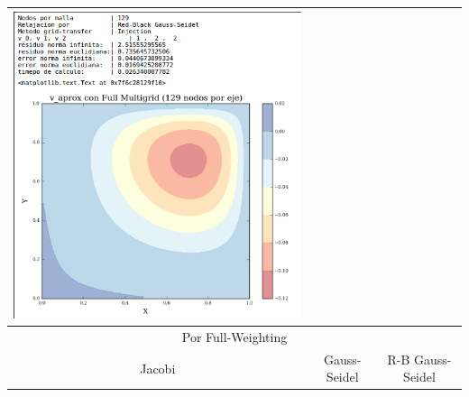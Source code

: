 \documentclass[letter,10pt]{article}
\begin{document}
\begin{table}[H]
\begin{tabular}[t]{|c|c|c|}
\includegraphics[scale=0.38]{img/fmg/mgRBGS129Ninjection} \\ \hline
\multicolumn{3}{|c|}{Por Full-Weighting} \\ \hline
Jacobi & Gauss-Seidel & R-B Gauss-Seidel\\ \hline 

\end{tabular}
\end{table}
\end{document}
